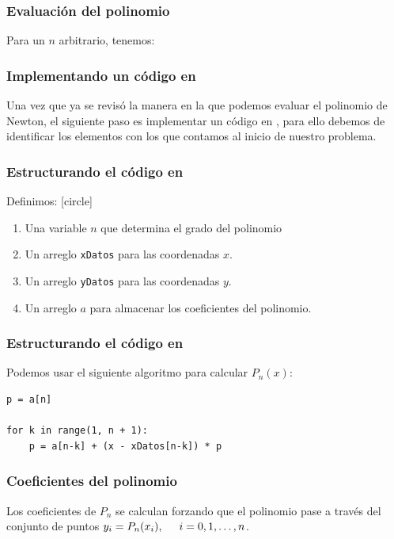 \begin{frame}
\frametitle{Evaluación del polinomio}
Para un $n$ arbitrario, tenemos:
\end{frame}
\begin{frame}
\frametitle{Implementando un código en \python}
Una vez que ya se revisó la manera en la que podemos evaluar el polinomio de Newton, el siguiente paso es implementar un código en \python, para ello debemos de identificar los elementos con los que contamos al inicio de nuestro problema.
\end{frame}
\begin{frame}[fragile]
\frametitle{Estructurando el código en \python}
Definimos:
[circle]
\begin{enumerate}[<+->]
\item Una variable $n$ que determina el grado del polinomio 
\item Un arreglo \texttt{xDatos} para las coordenadas $x$.
\item Un arreglo \texttt{yDatos} para las coordenadas $y$.
\item Un arreglo $a$ para almacenar los coeficientes del polinomio.
\end{enumerate}
\end{frame}
\begin{frame}[fragile]
\frametitle{Estructurando el código en \python}
Podemos usar el siguiente algoritmo para calcular $P_{n}(x)$:
\begin{lstlisting}[caption=Algoritmo para calcular $P_{n}$, style=FormattedNumber, basicstyle=\linespread{0.9}\ttfamily=\small, columns=fullflexible]
p = a[n]

for k in range(1, n + 1):
    p = a[n-k] + (x - xDatos[n-k]) * p
\end{lstlisting}
\end{frame}
\begin{frame}
\frametitle{Coeficientes del polinomio}
Los coeficientes de $P_{n}$ se calculan forzando que el polinomio pase a través del conjunto de puntos $y_{i} = P_{n} (x_{i}),\hspace{0.5cm} i =0, 1, \ldots, n$. 
\end{frame}
